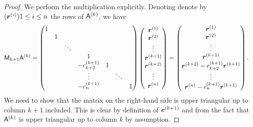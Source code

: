 \begin{proof}
    We perform the multiplication explicitly.
    Denoting denote by $(\mathbf{\boldsymbol{r}}^{(i)}){1 \leq i \leq n}$ the rows of $\mathsf A^{(k)}$,
    we have
    \[
        \mathsf M_{k + 1} \mathsf A^{(k)}
        =
        \begin{pmatrix}
                1   \\
          & 1  \\
          & &  \ddots \\
          & & & 1 & & & \\
          & & & - c^{(k+1)}_{k+2} & 1  \\
          & & & \vdots & & \ddots \\
          & & & - c^{(k+1)}_n & & & 1 \\
        \end{pmatrix}
        \begin{pmatrix}
            \mathbf{\boldsymbol{r}}^{(1)} \\
            \mathbf{\boldsymbol{r}}^{(2)} \\
            \vdots \\
            \mathbf{\boldsymbol{r}}^{(k+1)} \\
            \mathbf{\boldsymbol{r}}^{(k+2)} \\
            \vdots \\
            \mathbf{\boldsymbol{r}}^{(n)}
        \end{pmatrix}
        =
        \begin{pmatrix}
            \mathbf{\boldsymbol{r}}^{(1)} \\
            \mathbf{\boldsymbol{r}}^{(2)} \\
            \vdots \\
            \mathbf{\boldsymbol{r}}^{(k+1)} \\
            \mathbf{\boldsymbol{r}}^{(k+2)} - c^{(k+1)}_{k+2} \mathbf{\boldsymbol{r}}^{(k+1)} \\
            \vdots \\
            \mathbf{\boldsymbol{r}}^{(n)} - c^{(k+1)}_{n} \mathbf{\boldsymbol{r}}^{(k+1)}
        \end{pmatrix}.
    \]
    We need to show that the matrix on the right-hand side is upper triangular up to column $k+1$ included.
    This is clear by definition of $\mathbf{\boldsymbol{c}}^{(k+1)}$ and from the fact that $\mathsf A^{(k)}$ is upper triangular up to column $k$ by assumption.
\end{proof}

